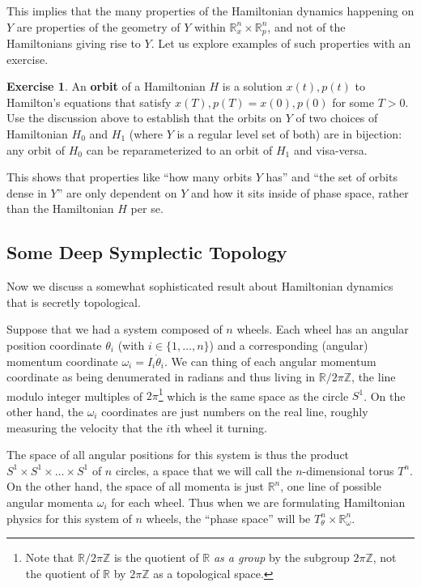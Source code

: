\documentclass[12pt]{article}
\theoremstyle{definition}
\newtheorem{exercise}[theorem]{Exercise}
\numberwithin{equation}{section}
\newcommand{\R}{{\mathbb R}}
\newcommand{\Z}{{\mathbb Z}}
\begin{document}
This implies that the many properties of the Hamiltonian dynamics happening on $Y$ are properties of the geometry of $Y$ within $\R^n_x \times \R^n_p$, and not of the Hamiltonians giving rise to $Y$. Let us explore examples of such properties with an exercise.

\begin{exercise} An {\bf orbit} of a Hamiltonian $H$ is a solution $x(t),p(t)$ to Hamilton's equations that satisfy $x(T),p(T) = x(0),p(0)$ for some $T > 0$. Use the discussion above to establish that the orbits on $Y$ of two choices of Hamiltonian $H_0$ and $H_1$ (where $Y$ is a regular level set of both) are in bijection: any orbit of $H_0$ can be reparameterized to an orbit of $H_1$ and visa-versa. 

This shows that properties like ``how many orbits $Y$ has'' and ``the set of orbits dense in $Y$'' are only dependent on $Y$ and how it sits inside of phase space, rather than the Hamiltonian $H$ per se.
\end{exercise}

\subsection{Some Deep Symplectic Topology} Now we discuss a somewhat sophisticated result about Hamiltonian dynamics that is secretly topological. 

Suppose that we had a system composed of $n$ wheels. Each wheel has an angular position coordinate $\theta_i$ (with $i \in \{1,\dots,n\}$) and a corresponding (angular) momentum coordinate $\omega_i = I_i\dot{\theta}_i$. We can thing of each angular momentum coordinate as being denumerated in radians and thus living in $\R/2\pi \Z$, the line modulo integer multiples of $2\pi$\footnote{Note that $\R/2\pi \Z$ is the quotient of $\R$ \emph{as a group} by the subgroup $2\pi \Z$, not the quotient of $\R$ by $2\pi \Z$ as a topological space.} which is the same space as the circle $S^1$. On the other hand, the $\omega_i$ coordinates are just numbers on the real line, roughly measuring the velocity that the $i$th wheel it turning. 

The space of all angular positions for this system is thus the product $S^1 \times S^1 \times \dots \times S^1$ of $n$ circles, a space that we will call the $n$-dimensional torus $T^n$. On the other hand, the space of all momenta is just $\R^n$, one line of possible angular momenta $\omega_i$ for each wheel. Thus when we are formulating Hamiltonian physics for this system of $n$ wheels, the ``phase space'' will be $T^n_\theta \times \R^n_\omega$. 
\end{document}
